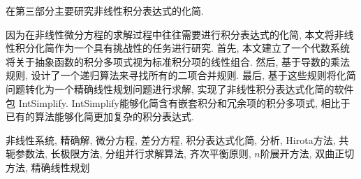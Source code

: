 在第三部分主要研究非线性积分表达式的化简.

因为在非线性微分方程的求解过程中往往需要进行积分表达式的化简, 本文将非线性积分化简作为一个具有挑战性的任务进行研究. 首先, 本文建立了一个代数系统将关于抽象函数的积分多项式视为标准积分项的线性组合. 然后, 基于导数的乘法规则, 设计了一个递归算法来寻找所有的二项合并规则. 最后, 基于这些规则将化简问题转化为一个精确线性规划问题进行求解, 实现了非线性积分表达式化简的软件包 IntSimplify.  IntSimplify能够化简含有嵌套积分和冗余项的积分多项式, 相比于已有的算法能够化简更加复杂的积分表达式. 

\bigskip

非线性系统, 精确解, 微分方程, 差分方程, 积分表达式化简, \Painleve{}分析, Hirota方法, 共轭参数法, 长极限方法, 分组并行求解算法, 齐次平衡原则, $n$阶展开方法, 双曲正切方法, 精确线性规划



